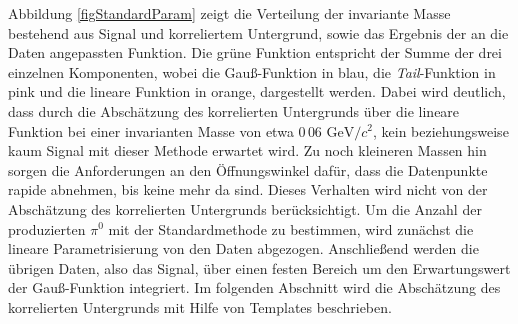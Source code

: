 \newline
Abbildung \ref{figStandardParam} zeigt die Verteilung der invariante Masse bestehend aus Signal und korreliertem Untergrund, sowie das Ergebnis der an die Daten angepassten Funktion.
Die grüne Funktion entspricht der Summe der drei einzelnen Komponenten, wobei die Gauß-Funktion in blau, die \textit{Tail}-Funktion in pink und die lineare Funktion in orange, dargestellt werden.
Dabei wird deutlich, dass durch die Abschätzung des korrelierten Untergrunds über die lineare Funktion bei einer invarianten Masse von etwa $0\,06\text{ GeV}/c^{2}$, kein beziehungsweise kaum Signal mit dieser Methode erwartet wird.
Zu noch kleineren Massen hin sorgen die Anforderungen an den Öffnungswinkel dafür, dass die Datenpunkte rapide abnehmen, bis keine mehr da sind.
Dieses Verhalten wird nicht von der Abschätzung des korrelierten Untergrunds berücksichtigt.
\newline
Um die Anzahl der produzierten $\pi^{0}$ mit der Standardmethode zu bestimmen, wird zunächst die lineare Parametrisierung von den Daten abgezogen.
Anschließend werden die übrigen Daten, also das Signal, über einen festen Bereich um den Erwartungswert der Gauß-Funktion integriert.
\newline
Im folgenden Abschnitt wird die Abschätzung des korrelierten Untergrunds mit Hilfe von Templates beschrieben.